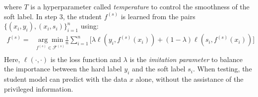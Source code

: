 where $T$ is a hyperparameter called \textit{temperature} to control the smoothness of the soft label. In step 3, the student ${f}^{(s)}$ is learned from the pairs $\{\left(x_i,y_i\right),\left(x_i,s_i\right)\}_{i=1}^n$ using:
\begin{equation}\label{eq:distill}
\begin{aligned}
f^{(s)}=&\underset{f^{(s)} \in \mathcal{F}^{(s)}}{\arg \min}\frac{1}{n}\sum_{i=1}^{n}\bigg[\lambda\ell\left(y_i,f^{(s)}(x_i)\right)+(1-\lambda)\ell\left(s_i,f^{(s)}(x_i)\right)\bigg]\\
\end{aligned}
\end{equation}
Here, $\ell(\cdot,\cdot)$ is the loss function and $\lambda$ is the \textit{imitation parameter} to balance the importance between the hard label $y_i$ and the soft label $s_i$. When testing, the student model can predict with the data $x$ alone, without the assistance of the privileged information.

